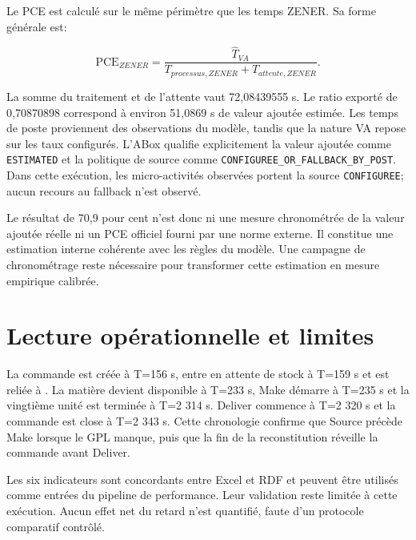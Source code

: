 Le PCE est calculé sur le même périmètre que les temps ZENER. Sa forme générale est:

\begin{equation}
\mathrm{PCE}_{ZENER}=\frac{\widehat{T}_{VA}}{T_{processus,ZENER}+T_{attente,ZENER}}.
\label{eq:pce-zener}
\end{equation}

La somme du traitement et de l'attente vaut 72,08439555 s. Le ratio exporté de 0,70870898 correspond à environ 51,0869 s de valeur ajoutée estimée. Les temps de poste proviennent des observations du modèle, tandis que la nature VA repose sur les taux configurés. L'ABox qualifie explicitement la valeur ajoutée comme \texttt{ESTIMATED} et la politique de source comme \texttt{CONFIGUREE\_OR\_FALLBACK\_BY\_POST}. Dans cette exécution, les micro-activités observées portent la source \texttt{CONFIGUREE}; aucun recours au fallback n'est observé.

Le résultat de 70,9 pour cent n'est donc ni une mesure chronométrée de la valeur ajoutée réelle ni un PCE officiel fourni par une norme externe. Il constitue une estimation interne cohérente avec les règles du modèle. Une campagne de chronométrage reste nécessaire pour transformer cette estimation en mesure empirique calibrée.

\section{Lecture opérationnelle et limites}

La commande est créée à T=156 s, entre en attente de stock à T=159 s et est reliée à . La matière devient disponible à T=233 s, Make démarre à T=235 s et la vingtième unité est terminée à T=2 314 s. Deliver commence à T=2 320 s et la commande est close à T=2 343 s. Cette chronologie confirme que Source précède Make lorsque le GPL manque, puis que la fin de la reconstitution réveille la commande avant Deliver.

Les six indicateurs sont concordants entre Excel et RDF et peuvent être utilisés comme entrées du pipeline de performance. Leur validation reste limitée à cette exécution. Aucun effet net du retard n'est quantifié, faute d'un protocole comparatif contrôlé.
